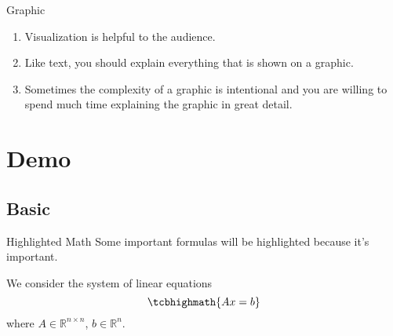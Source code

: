 \documentclass[compress,aspectratio=43]{beamer}
\begin{document}
\begin{frame}{Graphic}
    \begin{enumerate}
        \item Visualization is helpful to the audience.

              \medskip
        \item Like text, you should explain everything that is shown on a graphic.

              \medskip
        \item Sometimes the complexity of a graphic is intentional and you are willing to spend much time explaining the graphic in great detail.
    \end{enumerate}

\end{frame}

\section{Demo}\label{sec:demo}

\subsection{Basic}

\begin{frame}{Highlighted Math}
    Some important formulas will be \alert{highlighted} because it's important.

    \medskip
    We consider the system of linear equations
    \begin{equation}\label{eq:LE}
        \tcbhighmath{Ax = b}
    \end{equation}
    where $A\in\mathbb{R}^{n \times n}$, $b\in\mathbb{R}^n$.
\end{frame}
\end{document}
